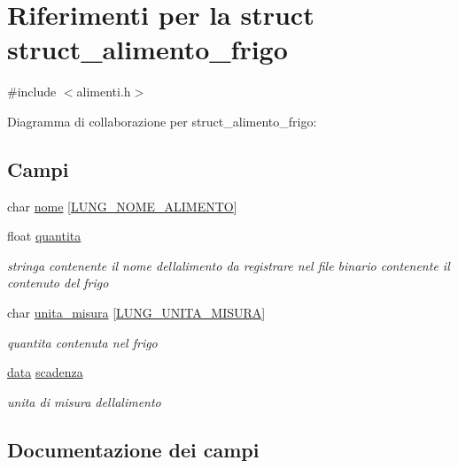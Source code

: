 \hypertarget{structstruct__alimento__frigo}{}\section{Riferimenti per la struct struct\+\_\+alimento\+\_\+frigo}
\label{structstruct__alimento__frigo}


{\ttfamily \#include $<$alimenti.\+h$>$}



Diagramma di collaborazione per struct\+\_\+alimento\+\_\+frigo\+:
\subsection*{Campi}
\begin{DoxyCompactItemize}
\item 
char \hyperlink{structstruct__alimento__frigo_a9143c91ccee04bad304a663484e710f7}{nome} \mbox{[}\hyperlink{alimenti_8h_af503a16b1a63b47d6a5b2edd94b5caf2}{L\+U\+N\+G\+\_\+\+N\+O\+M\+E\+\_\+\+A\+L\+I\+M\+E\+N\+TO}\mbox{]}
\item 
float \hyperlink{structstruct__alimento__frigo_a9cce03ebdd2af11fb8b950d6b0743dba}{quantita}
\begin{DoxyCompactList}\small\item\em stringa contenente il nome dell\textquotesingle{}alimento da registrare nel file binario contenente il contenuto del frigo \end{DoxyCompactList}\item 
char \hyperlink{structstruct__alimento__frigo_afbd3224290ae7df2c87de5181ff14c11}{unita\+\_\+misura} \mbox{[}\hyperlink{alimenti_8h_ade0f1f034a3ec6c04b8e29f4730db983}{L\+U\+N\+G\+\_\+\+U\+N\+I\+T\+A\+\_\+\+M\+I\+S\+U\+RA}\mbox{]}
\begin{DoxyCompactList}\small\item\em quantita contenuta nel frigo \end{DoxyCompactList}\item 
\hyperlink{date_8h_a511ae0b1c13f95e5f08f1a0dd3da3d93}{data} \hyperlink{structstruct__alimento__frigo_abb5328b46b9c5dfefab9fd0395b5e8f0}{scadenza}
\begin{DoxyCompactList}\small\item\em unita di misura dell\textquotesingle{}alimento \end{DoxyCompactList}\end{DoxyCompactItemize}


\subsection{Documentazione dei campi}
\mbox{\label{structstruct__alimento__frigo_a9143c91ccee04bad304a663484e710f7}} 
